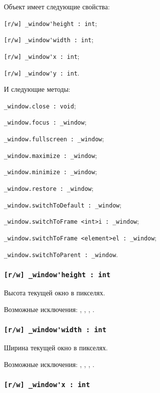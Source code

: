 Объект \window{} имеет следующие свойства:
\begin{icItems}
	\item \lstinline|[r/w] _window'height : int|;
	\item \lstinline|[r/w] _window'width : int|;
	\item \lstinline|[r/w] _window'x : int|;
	\item \lstinline|[r/w] _window'y : int|.
\end{icItems}

И следующие методы:
\begin{icItems}
	\item \lstinline|_window.close : void|;
	\item \lstinline|_window.focus : _window|;
	\item \lstinline|_window.fullscreen : _window|;
	\item \lstinline|_window.maximize : _window|;
	\item \lstinline|_window.minimize : _window|;
	\item \lstinline|_window.restore : _window|;
	\item \lstinline|_window.switchToDefault : _window|;
	\item \lstinline|_window.switchToFrame <int>i : _window|;
	\item \lstinline|_window.switchToFrame <element>el : _window|;
	\item \lstinline|_window.switchToParent : _window|.
\end{icItems}

\subsubsection{\lstinline|[r/w] _window'height : int|}

Высота текущей окно в пикселях.

Возможные исключения: , , , .

\subsubsection{\lstinline|[r/w] _window'width : int|}

Ширина текущей окно в пикселях.

Возможные исключения: , , , .

\subsubsection{\lstinline|[r/w] _window'x : int|}

